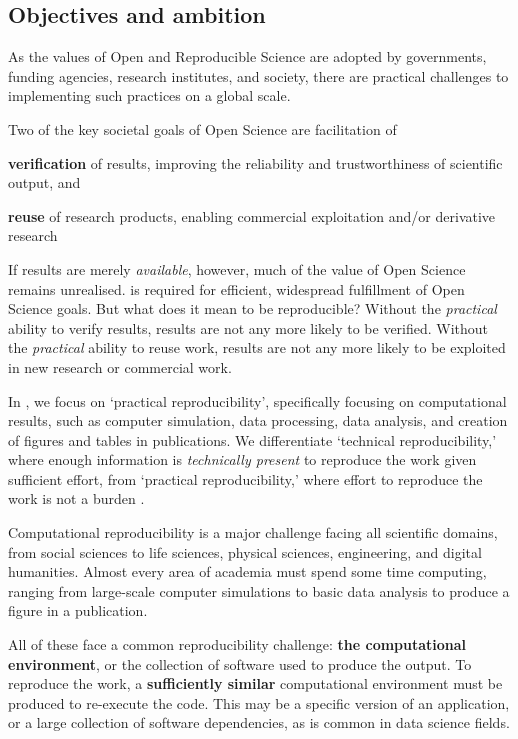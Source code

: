 \subsection{Objectives and ambition}

\label{sect:objectives}

As the values of Open and Reproducible Science are adopted by
governments, funding agencies, research institutes, and society,
there are practical challenges to implementing such practices on a global scale.

Two of the key societal goals of Open Science are facilitation of

\begin{compactenum}
\item \textbf{verification} of results, improving the reliability and trustworthiness of scientific output, and
\item \textbf{reuse} of research products, enabling commercial exploitation and/or derivative research
\end{compactenum}

If results are merely \emph{available}, however,
much of the value of Open Science remains unrealised.
 is required for efficient, widespread fulfillment of Open Science goals.
But what does it mean to be reproducible?
Without the \emph{practical} ability to verify results, results are not
any more likely to be verified.
Without the \emph{practical} ability to reuse work, results are not
any more likely to be exploited in new research or commercial work.

In \TheProject, we focus on `practical reproducibility',
specifically focusing on computational results, such as computer simulation, data
processing, data analysis, and creation of figures and tables in publications.
We differentiate `technical reproducibility,'
where enough information is \emph{technically present} to reproduce the work given sufficient effort,
from `practical reproducibility,'
where effort to reproduce the work is not a burden \cite{binder}.


Computational reproducibility is a major challenge facing all scientific domains,
from social sciences to life sciences, physical sciences, engineering, and digital humanities.
Almost every area of academia must spend some time computing,
ranging from large-scale computer simulations to basic data analysis to produce a figure in a publication.

All of these face a common reproducibility challenge: \textbf{the computational environment},
or the collection of software used to produce the output.
To reproduce the work, a \textbf{sufficiently similar} computational environment must be produced to re-execute the code.
This may be a specific version of an application, or a large collection of software dependencies,
as is common in data science fields.

